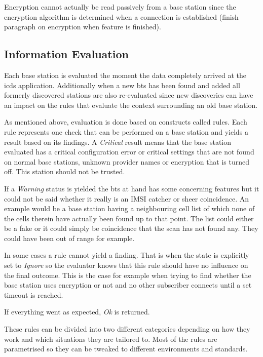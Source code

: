 Encryption cannot actually be read passively from a base station since the encryption algorithm is determined when a connection is established (finish paragraph on encryption when feature is finished).

\subsection{Information Evaluation}
\label{sec:info_evaluation}
Each base station is evaluated the moment the data completely arrived at the \gls{icds} application.
Additionally when a new \gls{bts} has been found and added all formerly discovered stations are also re-evaluated since new discoveries can have an impact on the rules that evaluate the context surrounding an old base station.

As mentioned above, evaluation is done based on constructs called rules.
Each rule represents one check that can be performed on a base station and yields a result based on its findings.
A \emph{Critical} result means that the base station evaluated has a critical configuration error or critical settings that are not found on normal base stations, \eg unknown provider names or encryption that is turned off.
This station should not be trusted.

If  a \emph{Warning} status is yielded the \gls{bts} at hand has some concerning features but it could not be said whether it really is an IMSI catcher or sheer coincidence.
An example would be a base station having a  neighbouring cell list of which none of the cells therein have actually been found up to that point.
The list could either be a fake or it could simply be coincidence that the scan has not found any.
They could have been out of range for example.

In some cases a rule cannot yield a finding.
That is when the state is explicitly set to \emph{Ignore} so the evaluator knows that this rule should have no influence on the final outcome.	
This is the case for example when trying to find whether the base station uses encryption or not and no other subscriber connects until a set timeout is reached.

If everything went as expected, \emph{Ok} is returned.

These rules can be divided into two different categories depending on how they work and which situations they are tailored to.
Most of the rules are parametrised so they can be tweaked to different environments and standards.

